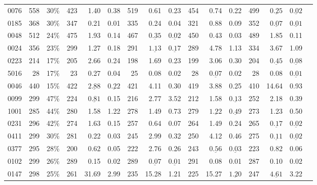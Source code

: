 \documentclass[10pt,twocolumn,letterpaper]{article}
\begin{document}
\begin{table}[t]
\begin{tabular}{lrrrrrrrrrrrrrrr}
0076 & 558 & 30\% & 423 & 1.40 & 0.38 & 519 & 0.61 & 0.23 & 454 & 0.74 & 0.22 & 499 & $\underline{\mathbf{0.25}}$ & $\underline{\mathbf{0.02}}$\\
0185 & 368 & 30\% & 347 & 0.21 & 0.01 & 335 & 0.24 & 0.04 & 321 & 0.88 & 0.09 & 352 & $\underline{\mathbf{0.07}}$ & $\underline{\mathbf{0.01}}$\\
0048 & 512 & 24\% & 475 & 1.93 & 0.14 & 467 & $\underline{\mathbf{0.35}}$ & $\underline{\mathbf{0.02}}$ & 450 & 0.43 & 0.03 & 489 & 1.85 & 0.11\\
0024 & 356 & 23\% & 299 & 1.27 & 0.18 & 291 & $\underline{\mathbf{1.13}}$ & $\underline{\mathbf{0.17}}$ & 289 & 4.78 & 1.13 & 334 & 3.67 & 1.09\\
0223 & 214 & 17\% & 205 & 2.66 & 0.24 & 198 & 1.69 & 0.23 & 199 & 3.06 & 0.30 & 204 & $\underline{\mathbf{0.45}}$ & $\underline{\mathbf{0.08}}$\\
5016 & 28 & 17\% & 23 & 0.27 & 0.04 & 25 & 0.08 & 0.02 & 28 & $\underline{\mathbf{0.07}}$ & 0.02 & 28 & 0.08 & $\underline{\mathbf{0.01}}$\\
0046 & 440 & 15\% & 422 & $\underline{\mathbf{2.88}}$ & $\underline{\mathbf{0.22}}$ & 421 & 4.11 & 0.30 & 419 & 3.88 & 0.25 & 410 & 14.64 & 0.93\\
\midrule
0099 & 299 & 47\% & 224 & $\underline{\mathbf{0.81}}$ & 0.15 & 216 & 2.77 & 3.52 & 212 & 1.58 & $\underline{\mathbf{0.13}}$ & 252 & 2.18 & 0.39\\
1001 & 285 & 44\% & 280 & 1.58 & 1.22 & 278 & 1.49 & 0.73 & 279 & $\underline{\mathbf{1.22}}$ & $\underline{\mathbf{0.49}}$ & 273 & 1.23 & 0.50\\
0231 & 296 & 42\% & 274 & 1.63 & 0.15 & 257 & 0.64 & 0.07 & 264 & 1.49 & 0.24 & 265 & $\underline{\mathbf{0.17}}$ & $\underline{\mathbf{0.02}}$\\
0411 & 299 & 30\% & 281 & 0.22 & 0.03 & 245 & 2.99 & 0.32 & 250 & 4.12 & 0.46 & 275 & $\underline{\mathbf{0.11}}$ & $\underline{\mathbf{0.02}}$\\
0377 & 295 & 28\% & 200 & 0.62 & 0.05 & 222 & 2.76 & 0.26 & 243 & $\underline{\mathbf{0.56}}$ & $\underline{\mathbf{0.03}}$ & 223 & 0.82 & 0.06\\
0102 & 299 & 26\% & 289 & 0.15 & 0.02 & 289 & $\underline{\mathbf{0.07}}$ & $\underline{\mathbf{0.01}}$ & 291 & 0.08 & 0.01 & 287 & 0.10 & 0.02\\
0147 & 298 & 25\% & 261 & 31.69 & 2.99 & 235 & 15.28 & 1.21 & 225 & 15.27 & $\underline{\mathbf{1.20}}$ & 247 & $\underline{\mathbf{4.61}}$ & 3.22\\

\end{tabular}
\end{table}
\end{document}
